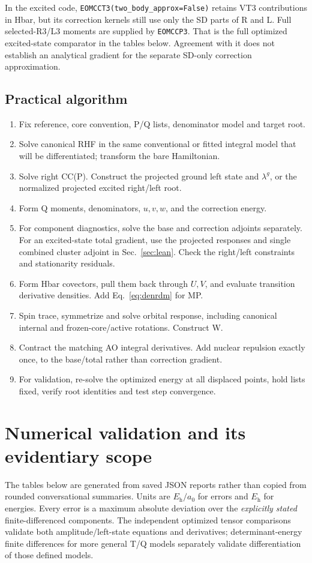 \documentclass[11pt,letterpaper]{article}
\numberwithin{equation}{section}
\newcommand{\eunit}{E_{\mathrm h}}
\newcommand{\gunit}{E_{\mathrm h}/a_0}
\begin{document}
In the excited code, \texttt{EOMCCT3(two\_body\_approx=False)} retains VT3
contributions in Hbar, but its correction kernels still use only the SD
parts of R and L. Full selected-R3/L3 moments are supplied by
\texttt{EOMCCP3}. That is the full optimized excited-state comparator in the
tables below. Agreement with it does not establish an analytical gradient
for the separate SD-only correction approximation.

\subsection{Practical algorithm}
\begin{enumerate}
\item Fix reference, core convention, P/Q lists, denominator model and target root.
\item Solve canonical RHF in the same conventional or fitted integral model
      that will be differentiated; transform the bare Hamiltonian.
\item Solve right CC(P). Construct the projected ground left state and
      $\lambda^g$, or the normalized projected excited right/left root.
\item Form Q moments, denominators, $u,v,w$, and the correction energy.
\item For component diagnostics, solve the base and correction adjoints
      separately. For an excited-state total gradient, use the projected
      responses and single combined cluster adjoint in Sec.~\ref{sec:lean}.
      Check the right/left constraints and stationarity residuals.
\item Form Hbar covectors, pull them back through $U,V$, and evaluate
      transition derivative densities. Add Eq.~\eqref{eq:denrdm} for MP.
\item Spin trace, symmetrize and solve orbital response, including canonical
      internal and frozen-core/active rotations. Construct W.
\item Contract the matching AO integral derivatives. Add nuclear repulsion
      exactly once, to the base/total rather than correction gradient.
\item For validation, re-solve the optimized energy at all displaced points,
      hold lists fixed, verify root identities and test step convergence.
\end{enumerate}

\clearpage
\section{Numerical validation and its evidentiary scope}
\label{sec:validation}
The tables below are generated from saved JSON reports rather than copied
from rounded conversational summaries. Units are $\gunit$ for errors and
$\eunit$ for energies. Every error is a maximum absolute deviation over the
\emph{explicitly stated} finite-differenced components. The independent
optimized tensor comparisons validate both amplitude/left-state equations
and derivatives; determinant-energy finite differences for more general
T/Q models separately validate differentiation of those defined models.
\end{document}
